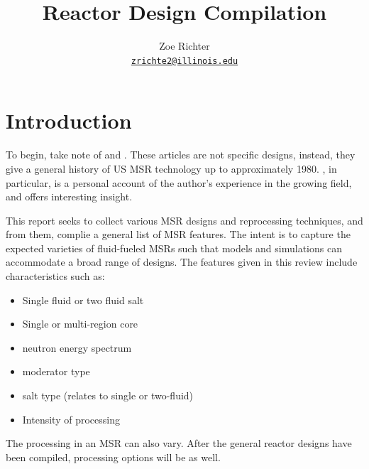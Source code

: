 \documentclass[letterpaper]{article}
\author{Zoe Richter
        \\ \href{mailto:zrichte2@illinois.edu}{\texttt{zrichte2@illinois.edu}}
}
\title{Reactor Design Compilation}
\begin{document}
\begin{titlepage}
\maketitle
\thispagestyle{empty}
\end{titlepage}

\section{Introduction}
To begin, take note of \cite{macpherson_molten_1985} and \cite{rosenthal_molten-salt_1970}.  These articles are not specific designs, instead, they give a general history of US MSR technology up to approximately 1980.  \cite{macpherson_molten_1985}, in particular, is a personal account of the author's experience in the growing field, and offers interesting insight.

This report seeks to collect various MSR designs and reprocessing techniques, and from them, complie a general list of MSR features.  The intent is to capture the expected varieties of fluid-fueled MSRs such that models and simulations can accommodate a broad range of designs.  The features given in this review include characteristics such as:

\begin{itemize}
\item Single fluid or two fluid salt
\item Single or multi-region core
\item neutron energy spectrum
\item moderator type
\item salt type (relates to single or two-fluid)
\item Intensity of processing
\end{itemize}

The processing in an MSR can also vary.  After the general reactor designs have been compiled, processing options will be as well.
\end{document}
